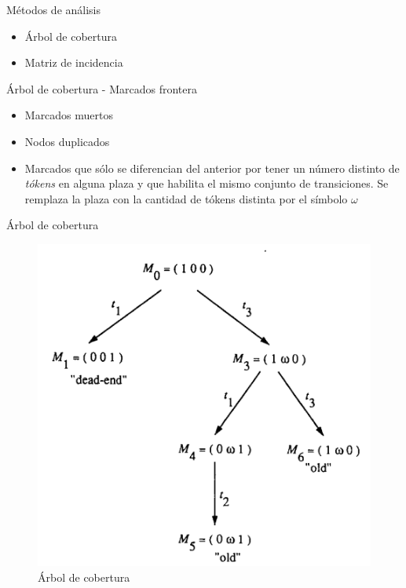 \documentclass[
compress,
xcolor=table,
dvipsnames,
]{beamer}
\begin{document}

\begin{frame}{Métodos de análisis}
    \begin{itemize}
        \item Árbol de cobertura
        \item Matriz de incidencia
    \end{itemize}
\end{frame}


\begin{frame}{Árbol de cobertura - Marcados frontera}
    \begin{itemize}
        \item Marcados muertos
        \item Nodos duplicados
        \item Marcados que sólo se diferencian del anterior por tener un número distinto de \textit{tókens} en alguna plaza y que habilita el mismo conjunto de transiciones. Se remplaza la plaza con la cantidad de tókens distinta por el símbolo $\omega$
    \end{itemize}
\end{frame}


\begin{frame}{Árbol de cobertura}
    \begin{figure}[h]
        \includegraphics[scale=0.45]{graphics/reachability_tree.png}
        \caption{Árbol de cobertura \citep{Murata:89}}
    \end{figure}
\end{frame}
\end{document}
